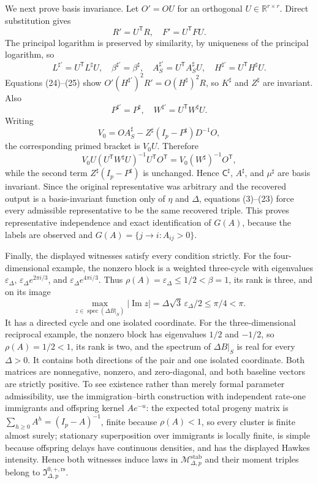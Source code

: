 We next prove basis invariance.  Let \(O'=OU\) for an orthogonal \(U\in\mathbb R^{r\times r}\).  Direct substitution gives
\[
 R'=U^{\mathsf T}R,\quad F'=U^{\mathsf T}FU.
\tag{24}
\]
The principal logarithm is preserved by similarity, by uniqueness of the principal logarithm, so
\[
 L^{\sharp\prime}=U^{\mathsf T}L^\sharp U,\quad
 \beta^{\sharp\prime}=\beta^\sharp,\quad
 A_S^{\sharp\prime}=U^{\mathsf T}A_S^\sharp U,\quad
 H^{\sharp\prime}=U^{\mathsf T}H^\sharp U.
\tag{25}
\]
Equations (24)--(25) show \(O'(H^{\sharp\prime})^2R'=O(H^\sharp)^2R\), so \(K^\sharp\) and \(Z^\sharp\) are invariant.  Also
\[
 P^{\sharp\prime}=P^\sharp,\quad
 W^{\sharp\prime}=U^{\mathsf T}W^\sharp U.
\tag{26}
\]
Writing
\[
 V_0=OA_S^\sharp-Z^\sharp(I_p-P^\sharp)D^{-1}O,
\]
the corresponding primed bracket is \(V_0U\).  Therefore
\[
 V_0U(U^{\mathsf T}W^\sharp U)^{-1}U^{\mathsf T}O^{\mathsf T}
 =V_0(W^\sharp)^{-1}O^{\mathsf T},
\]
while the second term \(Z^\sharp(I_p-P^\sharp)\) is unchanged.  Hence \(\mathsf C^\sharp\), \(A^\sharp\), and \(\mu^\sharp\) are basis invariant.  Since the original representative was arbitrary and the recovered output is a basis-invariant function only of \(\eta\) and \(\Delta\), equations (3)--(23) force every admissible representative to be the same recovered triple.  This proves representative independence and exact identification of \(G(A)\), because the labels are observed and \(G(A)=\{j\to i:A_{ij}>0\}\).

Finally, the displayed witnesses satisfy every condition strictly.  For the four-dimensional example, the nonzero block is a weighted three-cycle with eigenvalues \(\varepsilon_\Delta\), \(\varepsilon_\Delta e^{2\pi i/3}\), and \(\varepsilon_\Delta e^{4\pi i/3}\).  Thus \(\rho(A)=\varepsilon_\Delta\leq1/2<\beta=1\), its rank is three, and on its image
\[
 \max_{z\in\operatorname{spec}(\Delta B|_S)}|\operatorname{Im}z|
 =\Delta\sqrt3\,\varepsilon_\Delta/2\leq\pi/4<\pi.
\]
It has a directed cycle and one isolated coordinate.  For the three-dimensional reciprocal example, the nonzero block has eigenvalues \(1/2\) and \(-1/2\), so \(\rho(A)=1/2<1\), its rank is two, and the spectrum of \(\Delta B|_S\) is real for every \(\Delta>0\).  It contains both directions of the pair and one isolated coordinate.  Both matrices are nonnegative, nonzero, and zero-diagonal, and both baseline vectors are strictly positive.  To see existence rather than merely formal parameter admissibility, use the immigration--birth construction with independent rate-one immigrants and offspring kernel \(Ae^{-u}\): the expected total progeny matrix is \(\sum_{h\geq0}A^h=(I_p-A)^{-1}\), finite because \(\rho(A)<1\), so every cluster is finite almost surely; stationary superposition over immigrants is locally finite, is simple because offspring delays have continuous densities, and has the displayed Hawkes intensity.  Hence both witnesses induce laws in \(\mathcal M_{\Delta,p}^{\mathrm{stab}}\) and their moment triples belong to \(\mathfrak I_{\Delta,p}^{0,+,\mathrm{rs}}\).